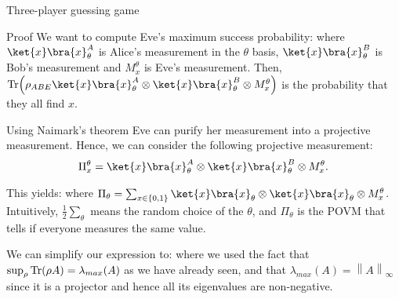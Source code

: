 \documentclass[a4paper]{article}
\begin{document}
\begin{parag}{Three-player guessing game}
    \begin{subparag}{Proof}
        We want to compute Eve's maximum success probability: 
        where $\ket{x}\bra{x}_{\theta}^A$ is Alice's measurement in the $\theta$ basis, $\ket{x}\bra{x}_{\theta}^B$ is Bob's measurement and $M_x^{\theta}$ is Eve's measurement. Then, $\Tr\left(\rho_{ABE} \ket{x}\bra{x}_{\theta}^A \otimes \ket{x}\bra{x}_{\theta}^B \otimes M_x^{\theta}\right)$ is the probability that they all find $x$.

        Using Naimark's theorem Eve can purify her measurement into a projective measurement. Hence, we can consider the following projective measurement: 
        \[\Pi_x^{\theta} = \ket{x}\bra{x}_{\theta}^{A} \otimes \ket{x}\bra{x}_{\theta}^{B} \otimes M_x^{\theta}.\]
        
        This yields: 
        where $\Pi_{\theta} = \sum_{x \in \left\{0, 1\right\}} \ket{x}\bra{x}_{\theta} \otimes \ket{x}\bra{x}_{\theta} \otimes M_x^{\theta}$. Intuitively, $\frac{1}{2} \sum_{\theta} $ means the random choice of the $\theta$, and $\Pi_{\theta}$ is the POVM that tells if everyone measures the same value.

        We can simplify our expression to:
        where we used the fact that $\sup_{\rho} \Tr\left(\rho A\right) = \lambda_{max}\left(A\right)$ as we have already seen, and that $\lambda_{max}\left(A\right) = \left\|A\right\|_{\infty}$ since it is a projector and hence all its eigenvalues are non-negative.


\end{subparag}
\end{parag}
\end{document}
